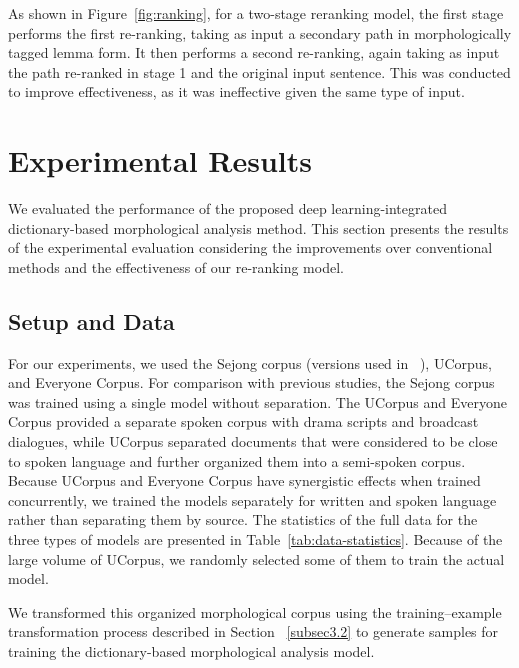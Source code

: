 \documentclass[AMS,STIX2COL]{WileyNJD-v2}
\begin{document}
    As shown in Figure~\ref{fig:ranking}, for a two-stage reranking model, the first stage performs the first re-ranking, taking as input a secondary path in morphologically tagged lemma form. It then performs a second re-ranking, again taking as input the path re-ranked in stage 1 and the original input sentence. This was conducted to improve effectiveness, as it was ineffective given the same type of input.


    \section{Experimental Results}\label{sec:results}

    We evaluated the performance of the proposed deep learning-integrated dictionary-based morphological analysis method. This section presents the results of the experimental evaluation considering the improvements over conventional methods and the effectiveness of our re-ranking model.

    \subsection{Setup and Data}\label{subsec5.1}

    For our experiments, we used the Sejong corpus (versions used in ~\cite{NaSH2014, NaSH2015, NaSH2018, SongHJ2019, SongHJ2020}), UCorpus\cite{UCorpusHG}, and Everyone Corpus\cite{EveryoneCorpus}. For comparison with previous studies, the Sejong corpus was trained using a single model without separation. The UCorpus and Everyone Corpus provided a separate spoken corpus with drama scripts and broadcast dialogues, while UCorpus separated documents that were considered to be close to spoken language and further organized them into a semi-spoken corpus. Because UCorpus and Everyone Corpus have synergistic effects when trained concurrently, we trained the models separately for written and spoken language rather than separating them by source. The statistics of the full data for the three types of models are presented in Table~\ref{tab:data-statistics}. Because of the large volume of UCorpus, we randomly selected some of them to train the actual model.

    We transformed this organized morphological corpus using the training–example transformation process described in Section ~\ref{subsec3.2} to generate samples for training the dictionary-based morphological analysis model.
\end{document}

